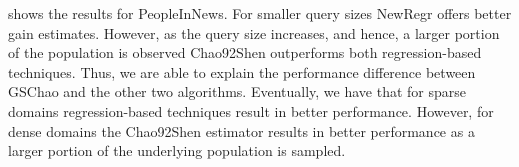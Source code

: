  shows the results for PeopleInNews. For smaller query sizes NewRegr offers better gain estimates. However, as the query size increases, and hence, a larger portion of the population is observed Chao92Shen outperforms both regression-based techniques. Thus, we are able to explain the performance difference between GSChao and the other two algorithms. Eventually, we have that for sparse domains regression-based techniques result in better performance. However, for dense domains the Chao92Shen estimator results in better performance as a larger portion of the underlying population is sampled.





